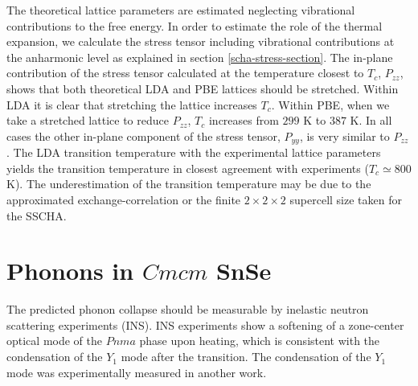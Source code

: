 The theoretical lattice parameters are estimated neglecting vibrational 
contributions to the free energy. In order to estimate the role of the thermal expansion, we calculate the stress tensor including vibrational contributions at the anharmonic level as explained in 
section \ref{scha-stress-section}. The in-plane contribution of the stress tensor calculated at the temperature 
closest to $T_{c}$, $P_{zz}$, shows that both theoretical LDA and PBE lattices should be stretched. Within LDA it 
is clear that stretching the lattice increases $T_{c}$. Within PBE, when we take a stretched lattice to reduce $P_{zz}$, $T_{c}$ increases from $299$ K to $387$ K. In all cases the other in-plane component of the stress tensor, 
$P_{yy}$, is very similar to $P_{zz}$. The LDA transition temperature with the experimental lattice parameters yields the transition temperature in closest agreement with experiments ($T_{c}\simeq800$ K). The underestimation of the 
transition temperature may be due to the approximated exchange-correlation or the finite $2\times2\times2$ supercell 
size taken for the SSCHA. \\

\section{Phonons in $Cmcm$ SnSe}

The predicted phonon collapse should be measurable by inelastic neutron scattering experiments (INS). INS experiments\cite{li2015orbitally} show a softening of a zone-center optical mode of the $Pnma$ phase upon heating, which
is consistent with the condensation of the $Y_{1}$ mode after the transition. The condensation of the $Y_{1}$ mode 
was experimentally measured in another work\cite{chatterji2018soft}. \\

